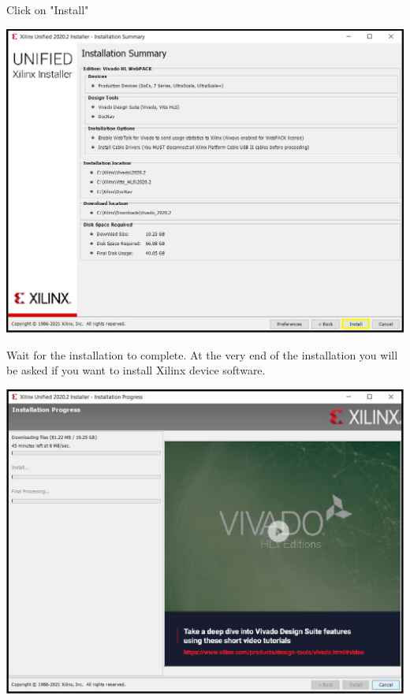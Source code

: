 \begin{minipage}{\linewidth}
  Click on "Install"
  \\
  \begin{center}
    \includegraphics[width=0.7\linewidth]{images/VivadoInstimg016.jpg}
  \end{center}
\end{minipage}

\begin{minipage}{\linewidth}
  Wait for the installation to complete. At the very end of the installation you will be asked if you want
  to install Xilinx device software.
  \\
  \begin{center}
    \includegraphics[width=0.7\linewidth]{images/VivadoInstimg017.jpg}
  \end{center}
\end{minipage}

